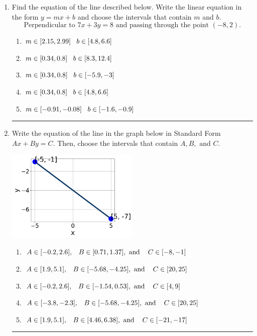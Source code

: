 \documentclass[14pt]{extbook}
\newcommand{\litem}[1]{\item#1\hspace*{-1cm}\rule{\textwidth}{0.4pt}}
\begin{document}
\begin{enumerate}
{\begin{enumerate}[label=\Alph*.]
\end{enumerate} }
\litem{
Find the equation of the line described below. Write the linear equation in the form $ y=mx+b $ and choose the intervals that contain $m$ and $b$.\[ \text{Perpendicular to } 7 x + 3 y = 8 \text{ and passing through the point } (-8, 2). \]\begin{enumerate}[label=\Alph*.]
\item \( m \in [2.15, 2.99] \hspace*{3mm} b \in [4.8, 6.6] \)
\item \( m \in [0.34, 0.8] \hspace*{3mm} b \in [8.3, 12.4] \)
\item \( m \in [0.34, 0.8] \hspace*{3mm} b \in [-5.9, -3] \)
\item \( m \in [0.34, 0.8] \hspace*{3mm} b \in [4.8, 6.6] \)
\item \( m \in [-0.91, -0.08] \hspace*{3mm} b \in [-1.6, -0.9] \)

\end{enumerate} }
\litem{
Write the equation of the line in the graph below in Standard Form $Ax+By=C$. Then, choose the intervals that contain $A, B, \text{ and } C$.
\begin{center}
    \includegraphics[width=0.5\textwidth]{../Figures/linearGraphToStandardB.png}
\end{center}
\begin{enumerate}[label=\Alph*.]
\item \( A \in [-0.2, 2.6], \hspace{3mm} B \in [0.71, 1.37], \text{ and } \hspace{3mm} C \in [-8, -1] \)
\item \( A \in [1.9, 5.1], \hspace{3mm} B \in [-5.68, -4.25], \text{ and } \hspace{3mm} C \in [20, 25] \)
\item \( A \in [-0.2, 2.6], \hspace{3mm} B \in [-1.54, 0.53], \text{ and } \hspace{3mm} C \in [4, 9] \)
\item \( A \in [-3.8, -2.3], \hspace{3mm} B \in [-5.68, -4.25], \text{ and } \hspace{3mm} C \in [20, 25] \)
\item \( A \in [1.9, 5.1], \hspace{3mm} B \in [4.46, 6.38], \text{ and } \hspace{3mm} C \in [-21, -17] \)


\end{enumerate}}
\end{enumerate}
\end{document}
